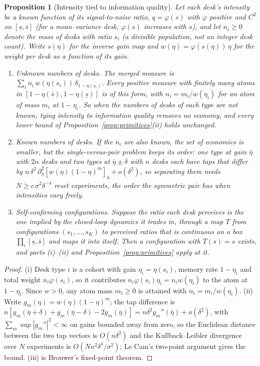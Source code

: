 \documentclass[12pt]{article}
\newtheorem{proposition}[theorem]{Proposition}
\theoremstyle{definition}
\theoremstyle{remark}
\begin{document}
\begin{proposition}[Intensity tied to information quality]\label{prop:tied}
Let each desk's intensity be a known function of its signal-to-noise ratio, $q=\varphi(s)$ with $\varphi$ positive and $C^2$ on $[\underline s,\bar s]$ (for a mean--variance desk, $\varphi(s)$ increases with $s$), and let $n_i\ge0$ denote the mass of desks with ratio $s_i$ (a divisible population, not an integer desk count). Write $s(\eta)$ for the inverse gain map and $w(\eta)=\varphi(s(\eta))\,\eta$ for the weight per desk as a function of its gain.
\begin{enumerate}[label=(\roman*)]
\item \emph{Unknown numbers of desks.} The merged measure is $\sum_in_i\,w(\eta(s_i))\,\delta_{1-\eta(s_i)}$. Every positive measure with finitely many atoms in $[1-\eta(\bar s),1-\eta(\underline s)]$ is of this form, with $n_i=m_i/w(\eta_i)$ for an atom of mass $m_i$ at $1-\eta_i$. So when the numbers of desks of each type are not known, tying intensity to information quality removes no economy, and every lower bound of Proposition~\ref{prop:primitives}(ii) holds unchanged.
\item \emph{Known numbers of desks.} If the $n_i$ are also known, the set of economies is smaller, but the single-versus-pair problem keeps its order: one type at gain $\bar\eta$ with $2n$ desks and two types at $\bar\eta\pm\delta$ with $n$ desks each have taps that differ by $n\,\delta^2\,\partial_\eta^2[w(\eta)(1-\eta)^m]_{\bar\eta}+o(\delta^2)$, so separating them needs $N\ge c\,\sigma^2\delta^{-4}$ reset experiments, the order the symmetric pair has when intensities vary freely.
\item \emph{Self-confirming configurations.} Suppose the ratio each desk perceives is the one implied by the closed-loop dynamics it trades in, through a map $T$ from configurations $(s_1,\dots,s_K)$ to perceived ratios that is continuous on a box $\prod_i[\underline s,\bar s]$ and maps it into itself. Then a configuration with $T(s)=s$ exists, and parts (i)--(ii) and Proposition~\ref{prop:primitives} apply at it.
\end{enumerate}
\end{proposition}

\begin{proof}
(i) Desk type $i$ is a cohort with gain $\eta_i=\eta(s_i)$, memory rate $1-\eta_i$ and total weight $n_i\varphi(s_i)$, so it contributes $n_i\varphi(s_i)\eta_i=n_iw(\eta_i)$ to the atom at $1-\eta_i$. Since $w>0$, any atom mass $m_i\ge0$ is attained with $n_i=m_i/w(\eta_i)$. (ii) Write $g_m(\eta)=w(\eta)(1-\eta)^m$; the tap difference is $n[g_m(\bar\eta+\delta)+g_m(\bar\eta-\delta)-2g_m(\bar\eta)]=n\delta^2g_m''(\bar\eta)+o(\delta^2)$, with $\sum_m\sup|g_m''|^2<\infty$ on gains bounded away from zero, so the Euclidean distance between the two tap vectors is $O(n\delta^2)$ and the Kullback--Leibler divergence over $N$ experiments is $O(Nn^2\delta^4/\sigma^2)$; Le Cam's two-point argument gives the bound. (iii) is Brouwer's fixed-point theorem.
\end{proof}
\end{document}
